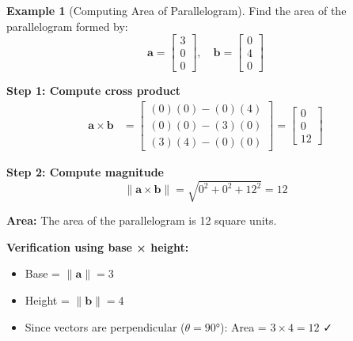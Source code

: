 \documentclass[12pt,a4paper]{article}
\theoremstyle{definition}
\newtheorem{example}{Example}[section]
\begin{document}
\begin{example}[Computing Area of Parallelogram]
Find the area of the parallelogram formed by:
\begin{equation}
\mathbf{a} = \begin{bmatrix} 3 \\ 0 \\ 0 \end{bmatrix}, \quad
\mathbf{b} = \begin{bmatrix} 0 \\ 4 \\ 0 \end{bmatrix}
\end{equation}

\textbf{Step 1: Compute cross product}
\begin{align}
\mathbf{a} \times \mathbf{b} &= \begin{bmatrix}
(0)(0) - (0)(4) \\
(0)(0) - (3)(0) \\
(3)(4) - (0)(0)
\end{bmatrix} = \begin{bmatrix}
0 \\
0 \\
12
\end{bmatrix}
\end{align}

\textbf{Step 2: Compute magnitude}
\begin{equation}
\|\mathbf{a} \times \mathbf{b}\| = \sqrt{0^2 + 0^2 + 12^2} = 12
\end{equation}

\textbf{Area:} The area of the parallelogram is 12 square units.

\textbf{Verification using base × height:}
\begin{itemize}
    \item Base = $\|\mathbf{a}\| = 3$
    \item Height = $\|\mathbf{b}\| = 4$
    \item Since vectors are perpendicular ($\theta = 90°$): Area = $3 \times 4 = 12$ ✓
\end{itemize}
\end{example}
\end{document}

